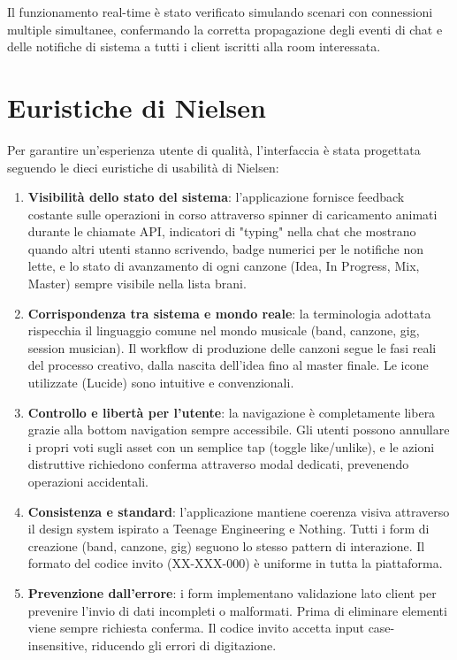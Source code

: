 \documentclass{report}
\begin{document}
Il funzionamento real-time è stato verificato simulando scenari con connessioni multiple simultanee, confermando la corretta propagazione degli eventi di chat e delle notifiche di sistema a tutti i client iscritti alla room interessata.


\section{Euristiche di Nielsen}

Per garantire un'esperienza utente di qualità, l'interfaccia è stata progettata seguendo le dieci euristiche di usabilità di Nielsen:

\begin{enumerate}
    \item \textbf{Visibilità dello stato del sistema}: l'applicazione fornisce feedback costante sulle operazioni in corso attraverso spinner di caricamento animati durante le chiamate API, indicatori di "typing" nella chat che mostrano quando altri utenti stanno scrivendo, badge numerici per le notifiche non lette, e lo stato di avanzamento di ogni canzone (Idea, In Progress, Mix, Master) sempre visibile nella lista brani.

    \item \textbf{Corrispondenza tra sistema e mondo reale}: la terminologia adottata rispecchia il linguaggio comune nel mondo musicale (band, canzone, gig, session musician). Il workflow di produzione delle canzoni segue le fasi reali del processo creativo, dalla nascita dell'idea fino al master finale. Le icone utilizzate (Lucide) sono intuitive e convenzionali.

    \item \textbf{Controllo e libertà per l'utente}: la navigazione è completamente libera grazie alla bottom navigation sempre accessibile. Gli utenti possono annullare i propri voti sugli asset con un semplice tap (toggle like/unlike), e le azioni distruttive richiedono conferma attraverso modal dedicati, prevenendo operazioni accidentali.

    \item \textbf{Consistenza e standard}: l'applicazione mantiene coerenza visiva attraverso il design system ispirato a Teenage Engineering e Nothing. Tutti i form di creazione (band, canzone, gig) seguono lo stesso pattern di interazione. Il formato del codice invito (XX-XXX-000) è uniforme in tutta la piattaforma.

    \item \textbf{Prevenzione dall'errore}: i form implementano validazione lato client per prevenire l'invio di dati incompleti o malformati. Prima di eliminare elementi viene sempre richiesta conferma. Il codice invito accetta input case-insensitive, riducendo gli errori di digitazione.


\end{enumerate}
\end{document}
